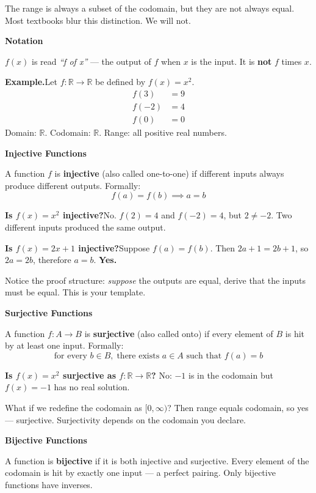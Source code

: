 \documentclass[12pt]{article}
\begin{document}
\medskip
The range is always a subset of the codomain, but they are not always equal.
Most textbooks blur this distinction. We will not.

\bigskip
\noindent\textbf{Notation}

$f(x)$ is read \textit{``f of x''} --- the output of $f$ when $x$ is the input.
It is \textbf{not} $f$ times $x$.

\medskip
\textbf{Example.}\quad Let $f\colon \mathbb{R} \to \mathbb{R}$ be defined by
$f(x) = x^2$.
\begin{align*}
  f(3)  &= 9 \\
  f(-2) &= 4 \\
  f(0)  &= 0
\end{align*}
Domain: $\mathbb{R}$.\quad
Codomain: $\mathbb{R}$.\quad
Range: all positive real numbers.

\bigskip
\noindent\textbf{Injective Functions}

A function $f$ is \textbf{injective} (also called one-to-one) if different inputs
always produce different outputs. Formally:
\[
  f(a) = f(b) \implies a = b
\]

\textbf{Is $f(x) = x^2$ injective?}\quad No. $f(2) = 4$ and $f(-2) = 4$,
but $2 \neq -2$. Two different inputs produced the same output.

\textbf{Is $f(x) = 2x + 1$ injective?}\quad Suppose $f(a) = f(b)$.
Then $2a + 1 = 2b + 1$, so $2a = 2b$, therefore $a = b$. \textbf{Yes.}

Notice the proof structure: \textit{suppose} the outputs are equal, derive that
the inputs must be equal. This is your template.

\bigskip
\noindent\textbf{Surjective Functions}

A function $f\colon A \to B$ is \textbf{surjective} (also called onto) if every
element of $B$ is hit by at least one input. Formally:
\[
  \text{for every } b \in B,\; \text{there exists } a \in A \text{ such that } f(a) = b
\]

\textbf{Is $f(x) = x^2$ surjective as $f\colon \mathbb{R} \to \mathbb{R}$?}\quad
No: $-1$ is in the codomain but $f(x) = -1$ has no real solution.

What if we redefine the codomain as $[0, \infty)$?
Then range equals codomain, so yes --- surjective.
Surjectivity depends on the codomain you declare.

\bigskip
\noindent\textbf{Bijective Functions}

A function is \textbf{bijective} if it is both injective and surjective.
Every element of the codomain is hit by exactly one input --- a perfect pairing.
Only bijective functions have inverses.
\end{document}
